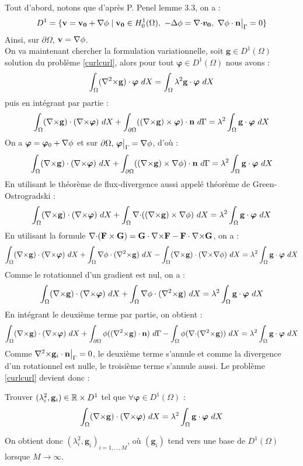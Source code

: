 Tout d'abord, notons que d'après P. Penel \cite{Penel2004} lemme 3.3, on a :
\[ D^1 = \{\mathbf{v}=\mathbf{v_0}+\grad\phi\; |\; \mathbf{v_0}\in H^1_0(\Omega),\ -\laplace\phi=\div\bm{v_0},\ \grad\phi\cdot \mathbf{n}\restr{\Gamma} = 0 \} \]
Ainsi, sur $\partial\Omega$, $\mathbf{v}={\nabla}\phi$.\\

On va maintenant chercher la formulation variationnelle, soit $\mathbf{g}\in D^1(\Omega)$ solution du problème \ref{curlcurl}, alors pour tout $\bm{\varphi}\in D^1(\Omega)$ nous avons :
\[ \int_\Omega ({\nabla^2\times} \mathbf{g})\cdot\bm{\varphi}\ dX = \int_\Omega\lambda^2 \mathbf{g}\cdot\bm{\varphi}\ dX \]
puis en intégrant par partie :
\[ \int_\Omega ({\nabla\times} \mathbf{g})\cdot({\nabla\times}\bm{\varphi})\ dX + \int_{\partial\Omega} (({\nabla\times} \mathbf{g})\times \bm{\varphi})\cdot \mathbf{n}\ d\Gamma = \lambda^2\int_\Omega \mathbf{g}\cdot\bm{\varphi}\ dX \]
On a $\bm{\varphi}=\bm{\varphi}_0+{\nabla}\phi$ et sur $\partial\Omega,\, \bm{\varphi}{\big\rvert_{\Gamma}}={\nabla}\phi$, d'où :
\[ \int_\Omega ({\nabla\times} \mathbf{g})\cdot({\nabla\times}\bm{\varphi})\ dX + \int_{\partial\Omega} (({\nabla\times} \mathbf{g})\times {\nabla}\phi)\cdot \mathbf{n}\ d\Gamma = \lambda^2\int_\Omega \mathbf{g}\cdot\bm{\varphi}\ dX \]
En utilisant le théorème de flux-divergence aussi appelé théorème de Green-Ostrogradski :
\[ \int_\Omega ({\nabla\times} \mathbf{g})\cdot({\nabla\times}\bm{\varphi})\ dX + \int_\Omega {\nabla\cdot}(({\nabla\times} \mathbf{g})\times {\nabla}\phi)\ dX = \lambda^2\int_\Omega \mathbf{g}\cdot\bm{\varphi}\ dX \]
En utilisant la formule ${\nabla\cdot}(\mathbf{F}\times \mathbf{G}) = \mathbf{G}\cdot {\nabla\times} \mathbf{F} - \mathbf{F}\cdot {\nabla\times} \mathbf{G}$, on a :
\[ \int_\Omega ({\nabla\times} \mathbf{g})\cdot({\nabla\times}\bm{\varphi})\ dX + \int_\Omega {\nabla}\phi\cdot({\nabla^2\times} \mathbf{g})\ dX -\int_\Omega ({\nabla\times} \mathbf{g})\cdot ({\nabla\times}{\nabla}\phi)\ dX  = \lambda^2\int_\Omega \mathbf{g}\cdot\bm{\varphi}\ dX \]
Comme le rotationnel d'un gradient est nul, on a :
\[ \int_\Omega ({\nabla\times} \mathbf{g})\cdot({\nabla\times}\bm{\varphi})\ dX + \int_\Omega {\nabla}\phi\cdot({\nabla^2\times} \mathbf{g})\ dX  = \lambda^2\int_\Omega \mathbf{g}\cdot\bm{\varphi}\ dX \]
En intégrant le deuxième terme par partie, on obtient :
\[ \int_\Omega ({\nabla\times} \mathbf{g})\cdot({\nabla\times}\bm{\varphi})\ dX + \int_{\partial\Omega} \phi(({\nabla^2\times} \mathbf{g})\cdot \mathbf{n})\ d\Gamma - \int_\Omega \phi({\nabla\cdot}({\nabla^2\times} \mathbf{g}))\ dX  = \lambda^2\int_\Omega \mathbf{g}\cdot\bm{\varphi}\ dX \]
Comme ${\nabla^2\times}  \mathbf{g}_i\cdot \mathbf{n}{\big\rvert_{\Gamma}} = 0$, le deuxième terme s'annule et comme la divergence d'un rotationnel est nulle, le troisième terme s'annule aussi. Le problème \ref{curlcurl} devient donc :
\begin{pb}\label{fveigen}
Trouver $(\lambda_i^2,\mathbf{g}_i)\in {\mathbb{R}}\times D^1$ tel que $\forall \bm{\varphi}\in D^1(\Omega)$ :
\begin{equation*}
\int_\Omega ({\nabla\times} \mathbf{g})\cdot({\nabla\times}\bm{\varphi})\ dX = \lambda^2\int_\Omega \mathbf{g}\cdot\bm{\varphi}\ dX
\end{equation*}
\end{pb}
On obtient donc $(\lambda_i^2,\mathbf{g}_i)_{i=1,\dots,M}$, où $(\mathbf{g}_i)$ tend vers une base de $D^1(\Omega)$ lorsque $M\rightarrow \infty$.
